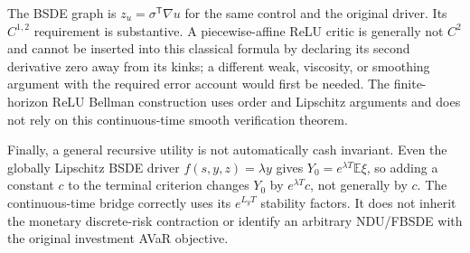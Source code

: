 The BSDE graph is $z_u=\sigma^{\mathsf T}\nabla u$ for the
same control and the original driver.  Its $C^{1,2}$ requirement
is substantive.  A piecewise-affine ReLU critic is generally not
$C^2$ and cannot be inserted into this classical formula by declaring
its second derivative zero away from its kinks; a different weak,
viscosity, or smoothing argument with the required error account
would first be needed.  The finite-horizon ReLU Bellman construction
uses order and Lipschitz arguments and does not rely on this
continuous-time smooth verification theorem.

Finally, a general recursive utility is not automatically cash
invariant.  Even the globally Lipschitz BSDE driver $f(s,y,z)=\lambda y$
gives $Y_0=e^{\lambda T}\mathbb E\xi$, so adding a constant
$c$ to the terminal criterion changes $Y_0$ by
$e^{\lambda T}c$, not generally by $c$.  The continuous-time
bridge correctly uses its $e^{L_yT}$ stability factors.  It does
not inherit the monetary discrete-risk contraction or identify an
arbitrary NDU/FBSDE with the original investment AVaR objective.
